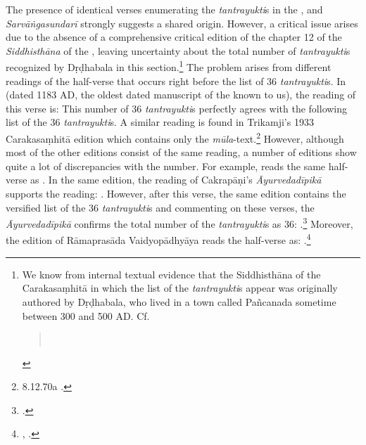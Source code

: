 The presence of identical verses enumerating the \emph{tantrayukti}s in the \AHS, \CS and \emph{Sarvāṅgasundarī} strongly suggests a shared origin. However, a critical issue arises due to the absence of a comprehensive critical edition of the chapter 12 of the \emph{Siddhisthāna} of the \CS, leaving uncertainty about the total number of \emph{tantrayukti}s recognized by Dṛḍhabala in this section.\footnote{We know from internal textual evidence that the Siddhisthāna of the Carakasaṃhitā in which the list of the \emph{tantrayukti}s appear was originally authored by Dṛḍhabala, who lived in a town called Pañcanada sometime between 300 and 500 AD. Cf. 
	\begin{verse}
		 \\
	\end{verse}
	} 
The problem arises from different readings of the half-verse that occurs right before the list of 36 \emph{tantrayukti}s. In  (dated 1183 AD, the oldest dated manuscript of the \CS known to us), the reading of this verse is:	
This number of 36 \emph{tantrayukti}s perfectly agrees with the following list of 
the 36 \emph{tantrayukti}s. A similar reading is found in Trikamji's 1933 
Carakasaṃhitā edition which contains only the 
\emph{mūla}-text.\footnote{		
	8.12.70a \parencite[972]{cara-trikamji}.} 
However, although most of the other editions consist of the same reading, a number of editions show quite a lot of discrepancies with the number. For example,  reads the same half-verse as 
. 
In the same edition, the reading of Cakrapāṇi's \emph{Āyurvedadīpikā} supports the reading: 
. 
However, after this verse, the same edition contains the versified list of the 36 \emph{tantrayukti}s and commenting on these verses, the \emph{Āyurvedadīpikā} confirms the total number of the \emph{tantrayukti}s as 36: 
.\footcite[737]{cara-trikamji3} 
Moreover, the edition of Rāmaprasāda Vaidyopādhyāya reads the half-verse as: 
.\footnote{\cite[1913]{vaid-1911}, \cite[1020]{}.} 
